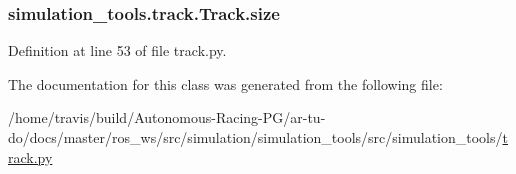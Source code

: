 \subsubsection[{\texorpdfstring{size}{size}}]{\setlength{\rightskip}{0pt plus 5cm}simulation\+\_\+tools.\+track.\+Track.\+size}\hypertarget{classsimulation__tools_1_1track_1_1_track_a69be8807eecacfd98981e206ea3a003f}{}\label{classsimulation__tools_1_1track_1_1_track_a69be8807eecacfd98981e206ea3a003f}


Definition at line 53 of file track.\+py.



The documentation for this class was generated from the following file\+:\begin{DoxyCompactItemize}
\item 
/home/travis/build/\+Autonomous-\/\+Racing-\/\+P\+G/ar-\/tu-\/do/docs/master/ros\+\_\+ws/src/simulation/simulation\+\_\+tools/src/simulation\+\_\+tools/\hyperlink{track_8py}{track.\+py}\end{DoxyCompactItemize}
